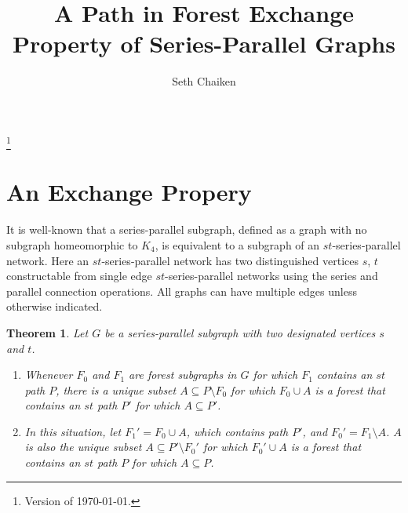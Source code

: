 \documentclass[12pt,leqno]{amsart}
\newtheorem{theorem}{Theorem}
\begin{document}
\title{A Path in Forest Exchange Property of Series-Parallel Graphs}

\author{Seth Chaiken}
\address{Computer Science Department\\
The University at Albany (SUNY)\\
Albany, NY 12222, U.S.A.}





\thanks{Version of \today.}

\maketitle
\pagestyle{headings}


\section{An Exchange Propery}

It is well-known that a series-parallel subgraph, defined as 
a graph with
no subgraph homeomorphic to $K_4$, is equivalent to a subgraph of an
$st$-series-parallel network.  Here an $st$-series-parallel network
has two distinguished vertices $s$, $t$
constructable from 
single edge $st$-series-parallel networks using the series and
parallel connection operations.  
All graphs can have multiple edges unless otherwise indicated.

\begin{theorem}
Let $G$ be a series-parallel subgraph 
with two designated vertices $s$ and $t$.

\begin{enumerate}
\item
Whenever 
$F_0$ and $F_1$ are forest subgraphs in $G$ for which
$F_1$ contains an $st$ path $P$, there is a unique 
subset $A\subseteq P\setminus F_0$ for which 
$F_0\cup A$ is a forest that contains an $st$ path $P'$
for which $A\subseteq P'$.

\item In this situation, let $F_1'=F_0\cup A$, which contains path $P'$,
and $F_0'=F_1\setminus A$.   $A$ is also the unique subset 
$A\subseteq P'\setminus F_0'$ for which 
$F_0'\cup A$ is a forest that contains an $st$ path $P$
for which $A\subseteq P$.
\end{enumerate}
\end{theorem}
\end{document}
